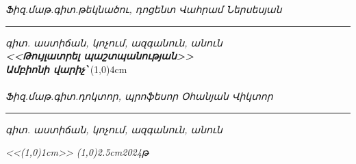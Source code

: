 \documentclass[12pt,a4paper]{article}
\begin{document}
\begin{titlepage}
	\vspace{20pt}
	{\fontsize{13}{13}\textit{\textarmenian{Ֆիզ.մաթ.գիտ.թեկնածու, դոցենտ Վահրամ Ներսեսյան}}}
	\hrule
	\vspace{5pt}
	
	{\scriptsize \textit{\textarmenian{գիտ. աստիճան, կոչում, ազգանուն, անուն}}}\\
	[4cm]
	
	{\fontsize{13}{13}\textbf{\textit{\textarmenian{<<Թույլատրել պաշտպանության>>}}}}\\
	
	
	{\fontsize{13}{13}\textbf{\textit{\textarmenian{Ամբիոնի վարիչ՝}}}{\fontsize{13}{13}}} \line(1,0){4cm}\\
	\\
	
	\vspace{20pt}
    {\fontsize{13}{13}\textit\textarmenian{{Ֆիզ.մաթ.գիտ.դոկտոր, պրոֆեսոր Օհանյան Վիկտոր}}}
	\hrule
	\vspace{5pt}
	
	{\scriptsize \textit{\textarmenian{գիտ. աստիճան, կոչում, ազգանուն, անուն}}}\\
	\vfill
	
	\textit{<<\line(1,0){1cm}>> \line(1,0){2.5cm}2024թ}
	
	\thispagestyle{empty}
\end{titlepage}
\end{document}
